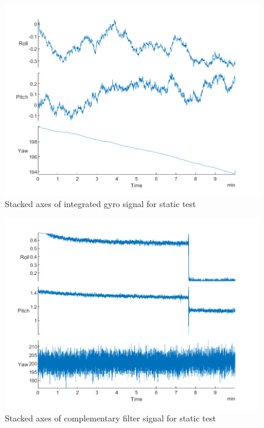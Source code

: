 \begin{figure}[H]
    \centering
    \includegraphics[scale=1]{graphics/Navigation/StackedStaticGyro.png}
    \caption{Stacked axes of integrated gyro signal for static test}
     \label{fig:Stacked axes of integrated gyro signal for static test}
\end{figure}

\begin{figure}[H]
    \centering
    \includegraphics[scale=1]{graphics/Navigation/StackedStaticComp.png}
    \caption{Stacked axes of complementary filter signal for static test}
     \label{fig:Stacked axes of complementary filter signal for static test}
\end{figure}

